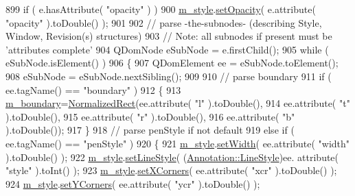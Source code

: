\begin{DoxyCode}
899     \textcolor{keywordflow}{if} ( e.hasAttribute( \textcolor{stringliteral}{"opacity"} ) )
900         \hyperlink{classOkular_1_1AnnotationPrivate_af49e79222d9e16611c0abd90533bc206}{m\_style}.\hyperlink{classOkular_1_1Annotation_1_1Style_a5bf0bdd3bf954271ed4ba831316a7ee7}{setOpacity}( e.attribute( \textcolor{stringliteral}{"opacity"} ).toDouble() );
901 
902     \textcolor{comment}{// parse -the-subnodes- (describing Style, Window, Revision(s) structures)}
903     \textcolor{comment}{// Note: all subnodes if present must be 'attributes complete'}
904     QDomNode eSubNode = e.firstChild();
905     \textcolor{keywordflow}{while} ( eSubNode.isElement() )
906     \{
907         QDomElement ee = eSubNode.toElement();
908         eSubNode = eSubNode.nextSibling();
909 
910         \textcolor{comment}{// parse boundary}
911         \textcolor{keywordflow}{if} ( ee.tagName() == \textcolor{stringliteral}{"boundary"} )
912         \{
913             \hyperlink{classOkular_1_1AnnotationPrivate_a58948ebd679895ca16c5f9f917f23323}{m\_boundary}=\hyperlink{classOkular_1_1NormalizedRect}{NormalizedRect}(ee.attribute( \textcolor{stringliteral}{"l"} ).toDouble(),
914                 ee.attribute( \textcolor{stringliteral}{"t"} ).toDouble(),
915                 ee.attribute( \textcolor{stringliteral}{"r"} ).toDouble(),
916                 ee.attribute( \textcolor{stringliteral}{"b"} ).toDouble());
917         \}
918         \textcolor{comment}{// parse penStyle if not default}
919         \textcolor{keywordflow}{else} \textcolor{keywordflow}{if} ( ee.tagName() == \textcolor{stringliteral}{"penStyle"} )
920         \{
921             \hyperlink{classOkular_1_1AnnotationPrivate_af49e79222d9e16611c0abd90533bc206}{m\_style}.\hyperlink{classOkular_1_1Annotation_1_1Style_af0643b15b59d282c196f0c6114493d9e}{setWidth}( ee.attribute( \textcolor{stringliteral}{"width"} ).toDouble() );
922             \hyperlink{classOkular_1_1AnnotationPrivate_af49e79222d9e16611c0abd90533bc206}{m\_style}.\hyperlink{classOkular_1_1Annotation_1_1Style_a67fc411e13a546c16661f618979d7afc}{setLineStyle}( (\hyperlink{classOkular_1_1Annotation_ac60f5de2d449043f9f849f3f081f8a7a}{Annotation::LineStyle})ee.
      attribute( \textcolor{stringliteral}{"style"} ).toInt() );
923             \hyperlink{classOkular_1_1AnnotationPrivate_af49e79222d9e16611c0abd90533bc206}{m\_style}.\hyperlink{classOkular_1_1Annotation_1_1Style_a779f3fb52625ebb8de7146d6cb3c186a}{setXCorners}( ee.attribute( \textcolor{stringliteral}{"xcr"} ).toDouble() );
924             \hyperlink{classOkular_1_1AnnotationPrivate_af49e79222d9e16611c0abd90533bc206}{m\_style}.\hyperlink{classOkular_1_1Annotation_1_1Style_a5ed91a2e29863c5635ac891451f8449d}{setYCorners}( ee.attribute( \textcolor{stringliteral}{"ycr"} ).toDouble() );

\end{DoxyCode}
